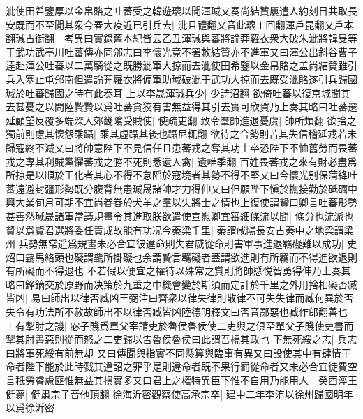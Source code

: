 泚使田希鑒厚以金帛賂之吐蕃受之韓遊瓌以聞渾瑊又奏尚結贊屢遣人約刻日共取長安既而不至聞其衆今春大疫近已引兵去|{
	泚且禮翻又音此瓌工回翻渾戶昆翻又戶本翻瑊古衘翻　考異曰實錄舊本紀皆云乙丑渾瑊與蕃將論莽羅衣衆大破朱泚將韓旻等于武功武亭川吐蕃傳亦同邠志曰李懷光竟不署敇結贊亦不進軍又曰渾公出斜谷曹子逹赴渾公吐蕃以二萬騎從之既勝泚軍大掠而去泚使田希鑒以金帛賂之盖尚結贊雖引兵入塞止屯邠南但遣論莾羅衣將偏軍助瑊破泚于武功大掠而去既受泚賂遂引兵歸國瑊於吐蕃歸國之時有此奏耳}
上以李晟渾瑊兵少|{
	少詩沼翻}
欲倚吐蕃以復京城聞其去甚憂之以問陸贄贄以爲吐蕃貪狡有害無益得其引去實可欣賀乃上奏其略曰吐蕃遷延顧望反覆多端深入郊畿隂受賊使|{
	使疏吏翻}
致令羣帥進退憂虞|{
	帥所類翻}
欲捨之獨前則慮其懷怨乘躡|{
	乘其虛躡其後也躡尼輒翻}
欲待之合勢則苦其失信稽延戎若未歸寇終不滅又曰將帥意陛下不見信任且患蕃戎之奪其功士卒恐陛下不恤舊勞而畏蕃戎之專其利賊黨懼蕃戎之勝不死則悉遺人禽|{
	遺唯季翻}
百姓畏蕃戎之來有財必盡爲所掠是以順於王化者其心不得不怠䧟於寇境者其勢不得不堅又曰今懷光别保蒲絳吐蕃遠避封疆形勢既分腹背無患瑊晟諸帥才力得伸又曰但願陛下愼於撫接勤於砥礪中興大業旬月可期不宜尚眷眷於犬羊之羣以失將士之情也上復使謂贄曰卿言吐蕃形勢甚善然瑊晟諸軍當議規畫令其進取朕欲遣使宣慰卿宜審細條流以聞|{
	條分也流派也}
贄以爲賢君選將委任責成故能有功况今秦梁千里|{
	秦謂咸陽長安古秦中之地梁謂梁州}
兵勢無常遥爲規畫未必合宜彼違命則失君威從命則害軍事進退羈礙難以成功|{
	史炤曰覊馬絡頭也礙謂覊所掛礙也余謂贄言羈礙者蓋謂欲進則有所羈而不得進欲退則有所礙而不得退也}
不若假以便宜之權待以殊常之賞則將帥感悦智勇得伸乃上奏其略曰鋒鏑交於原野而决策於九重之中機會變於斯須而定計於千里之外用捨相礙否臧皆凶|{
	易曰師出以律否臧凶王弼注曰齊衆以律失律則散律不可失失律而臧何異於否失令有功法所不赦故師出不以律否臧皆凶陸德明釋文曰否音鄙惡也臧作郎翻善也}
上有掣肘之譏|{
	宓子賤爲單父宰請吏於魯侯魯侯使二吏與之俱至單父子賤使吏書而掣其肘書惡則從而怒之二吏歸以告魯侯魯侯曰此謂吾橈其政也}
下無死綏之志|{
	兵志曰將軍死綏有前無却}
又曰傳聞與指實不同懸算與臨事有異又曰設使其中有肆情干命者陛下能於此時戮其違詔之罪乎是則違命者既不果行罰從命者又未必合宜徒費空言秖勞睿慮匪惟無益其損實多又曰君上之權特異臣下惟不自用乃能用人　癸酉涇王侹薨|{
	侹肅宗子音他頂翻}
徐海沂密觀察使高承宗卒|{
	建中二年李洧以徐州歸國明年以爲徐沂密}


